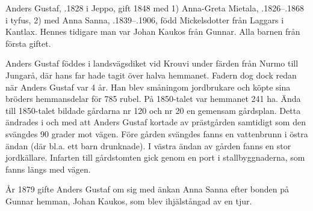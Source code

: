 Anders Gustaf, .1828 i Jeppo, gift 1848 med 1) Anna-Greta Mietala, .1826--.1868 i tyfus, 2) med Anna Sanna, .1839--.1906, född Mickelsdotter från Laggars i Kantlax. Hennes tidigare man var Johan Kaukos från Gunnar. Alla barnen från första giftet.
\begin{jhchildren}
  \item {}
  \item {}
  \item {}
  \item {}
  \item {}
  \item {}
  \item {}
  \item {}
  \item {}
\end{jhchildren}
Anders Gustaf föddes i landsvägsdiket vid Krouvi under färden från Nurmo till Jungarå, där hans far hade tagit över halva hemmanet. Fadern dog dock redan när Anders Gustaf var 4 år. Han blev småningom jordbrukare och köpte sina bröders hemmansdelar för 785 rubel. På 1850-talet var hemmanet 241 ha. Ända till 1850-talet bildade gårdarna nr 120 och nr 20 en gemensam gårdsplan. Detta ändrades i och med att Anders Gustaf kortade av prästgården samtidigt som den svängdes 90 grader mot vägen. Före gården svängdes fanns en vattenbrunn i östra ändan (där bl.a. ett barn drunknade). I västra ändan av gården fanns en stor jordkällare. Infarten till gårdstomten gick genom en port i stallbyggnaderna, som fanns längs med vägen.

År 1879 gifte Anders Gustaf om sig med änkan Anna Sanna efter bonden på Gunnar hemman, Johan Kaukos, som blev ihjälstångad av en tjur.

